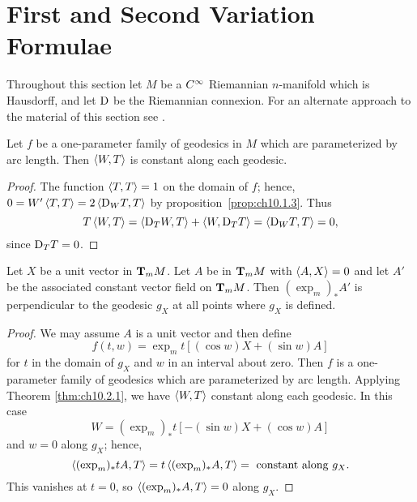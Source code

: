 \documentclass[../main]{subfiles}
\begin{document}
\section{First and Second Variation Formulae}\label{ch10:s2}

Throughout this section let $M$ be a $\CInfty$ Riemannian $n$-manifold which is Hausdorff, and let $\connection$ be the Riemannian connexion. For an alternate approach to the material of this section see \cite{ambrose1960the}.



\begin{theorem} \label{thm:ch10.2.1}
    Let $f$ be a one-parameter family of geodesics in $M$ which are parameterized by arc length. Then $\ip{W}{T}$ is constant along each geodesic.
\end{theorem}

\begin{proof}
    The function $\ip{T}{T} = 1$ on the domain of $f$; hence, $0=W'\ip{T}{T} = 2\ip{\connection_W T}{T}$ by proposition~\ref{prop:ch10.1.3}. Thus \[T\ip{W}{T} = \ip{\connection_T W}{T} + \ip{W}{\connection_T T} = \ip{\connection_W T}{T} = 0,\] since $\connection_T T = 0$.
\end{proof}



\begin{corollary} \label{cor:ch10.2.2}
    Let $X$ be a unit vector in $\tangentspace{M}{m}$. Let $A$ be in $\tangentspace{M}{m}$ with $\ip{A}{X} = 0$ and let $A'$ be the associated constant vector field on $\tangentspace{M}{m}$. Then $(\exp_m)_\ast A'$ is perpendicular to the geodesic $g_X$ at all points where $g_X$ is defined.
\end{corollary}

\begin{proof}
    We may assume $A$ is a unit vector and then define \[f(t, w) = \exp_m t[(\cos w)X + (\sin w)A]\] for $t$ in the domain of $g_X$ and $w$ in an interval about zero. Then $f$ is a one-parameter family of geodesics which are parameterized by arc length. Applying Theorem \ref{thm:ch10.2.1}, we have $\ip{W}{T}$ constant along each geodesic. In this case \[W = (\exp_m)_\ast t[-(\sin w)X + (\cos w)A]\] and $w = 0$ along $g_X$; hence, \[\ip{(\exp_m)_\ast t A}{T} = t\ip{(\exp_m)_\ast A}{T} = \text{ constant along }g_X.\] This vanishes at $t=0$, so $\ip{(\exp_m)_\ast A}{T}=0$ along $g_X.$
\end{proof}
\end{document}

